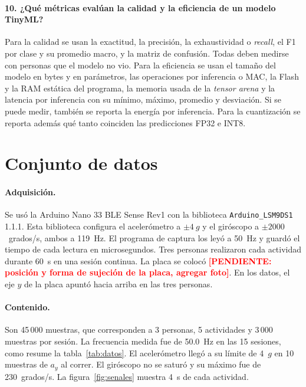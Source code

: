 \documentclass[11pt,a4paper]{article}
\newcommand{\pendiente}[1]{\textcolor{red}{\textbf{[PENDIENTE: #1]}}}
\begin{document}
\paragraph{10. ¿Qué métricas evalúan la calidad y la eficiencia de un modelo TinyML?}
Para la calidad se usan la exactitud, la precisión, la exhaustividad o \emph{recall}, el F1 por clase y su promedio macro, y la matriz de confusión. Todas deben medirse con personas que el modelo no vio. Para la eficiencia se usan el tamaño del modelo en bytes y en parámetros, las operaciones por inferencia o MAC, la Flash y la RAM estática del programa, la memoria usada de la \emph{tensor arena} y la latencia por inferencia con su mínimo, máximo, promedio y desviación. Si se puede medir, también se reporta la energía por inferencia. Para la cuantización se reporta además qué tanto coinciden las predicciones FP32 e INT8.

\section{Conjunto de datos}\label{sec:datos}

\paragraph{Adquisición.}
Se usó la Arduino Nano 33 BLE Sense Rev1 con la biblioteca \texttt{Arduino\_LSM9DS1} 1.1.1. Esta biblioteca configura el acelerómetro a $\pm4~g$ y el giróscopo a $\pm2000$~grados/s, ambos a 119~Hz. El programa de captura los leyó a 50~Hz y guardó el tiempo de cada lectura en microsegundos. Tres personas realizaron cada actividad durante 60~s en una sesión continua. La placa se colocó \pendiente{posición y forma de sujeción de la placa, agregar foto}. En los datos, el eje $y$ de la placa apuntó hacia arriba en las tres personas.

\paragraph{Contenido.}
Son 45\,000 muestras, que corresponden a 3 personas, 5 actividades y 3\,000 muestras por sesión. La frecuencia medida fue de 50.0~Hz en las 15 sesiones, como resume la tabla~\ref{tab:datos}. El acelerómetro llegó a su límite de 4~$g$ en 10 muestras de $a_y$ al correr. El giróscopo no se saturó y su máximo fue de 230~grados/s. La figura~\ref{fig:senales} muestra 4~s de cada actividad.
\end{document}

